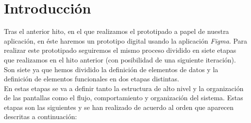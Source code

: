 \section{Introducción}
Tras el anterior hito, en el que realizamos el prototipado a papel de nuestra aplicación,
en éste haremos un prototipo digital usando la aplicación \textit{Figma}. 
Para realizar este prototipado seguiremos el mismo proceso dividido en siete etapas que
realizamos en el hito anterior (con posibilidad de una siguiente iteración). Son siete
ya que hemos dividido la definición de elementos de datos y la definición de elementos
funcionales en dos etapas distintas.\\

En estas etapas se va a definir tanto la estructura de alto nivel y la
organización de las pantallas como el flujo, comportamiento y organización del
sistema. Estas etapas son las siguientes y se han realizado de acuerdo al orden
que aparecen descritas a continuación:
